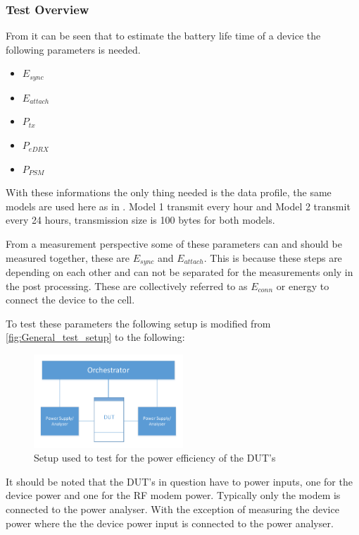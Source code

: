 \subsubsection{Test Overview}
From  it can be seen that to estimate the battery life time of a device the following parameters is needed.
\begin{itemize}
\item $E_{sync}$
\item $E_{attach}$
\item $P_{tx}$
\item $P_{eDRX}$
\item $P_{PSM}$
\end{itemize}

With these informations the only thing needed is the data profile, the same models are used here as in \citep{Power_article}. Model 1 transmit every hour and Model 2 transmit every 24 hours, transmission size is 100 bytes for both models. %

From a measurement perspective some of these parameters can and should be measured together, these are $E_{sync}$ and $E_{attach}$. This is because these steps are depending on each other and can not be separated for the measurements only in the post processing. These are collectively referred to as $E_{conn}$ or energy to connect the device to the cell. 

To test these parameters the following setup is modified from \autoref{fig:General_test_setup} to the following:

\begin{figure}[H]
\centering
\includegraphics[width=0.5\textwidth]{figures/IPE_test_setup.pdf}
\caption{Setup used to test for the power efficiency of the \gls{DUT}'s}
\label{fig:IPE_test_setup}
\end{figure}

It should be noted that the \gls{DUT}'s in question have to power inputs, one for the device power and one for the RF modem power. Typically only the modem is connected to the power analyser. With the exception of measuring the device power where the the device power input is connected to the power analyser.

